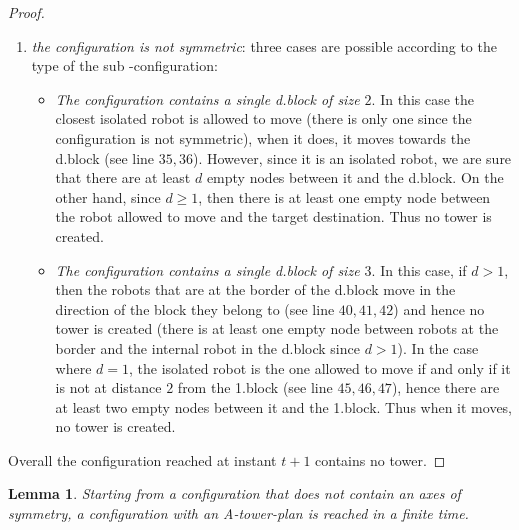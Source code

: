 \documentclass[12pt]{llncs}
\newtheorem{lem}{Lemma}
\begin{document}
\begin{proof}
\begin{enumerate}
\begin{itemize}
\end{itemize}
\item{\textit{the configuration is not symmetric}:} three cases are possible according to the type of the sub -configuration:
\begin{itemize}
\item{\textit{The configuration contains a single d.block of size $2$}}. In this case the closest isolated robot is allowed to move (there is only one since the configuration is not symmetric), when it does, it moves towards the d.block (see line $35,36$). However, since it is an isolated robot, we are sure that there are at least $d$ empty nodes between it and the d.block. On the other hand, since $d\geq 1$, then there is at least one empty node between the robot allowed to move and the target destination. Thus no tower is created.
\item{\textit{The configuration contains a single d.block of size $3$}}. In this case, if $d>1$, then the robots that are at the border of the d.block move in the direction of the block they belong to (see line $40,41,42$) and hence no tower is created (there is at least one empty node between robots at the border and the internal robot in the d.block since $d>1$). In the case where $d=1$, the isolated robot is the one allowed to move if and only if it is not at distance $2$ from the 1.block (see line $45,46,47$), hence there are at least two empty nodes between it and the 1.block. Thus when it moves, no tower is created.  
\end{itemize}
\end{enumerate}

Overall the configuration reached at instant $t+1$ contains no tower.
\end{proof} 

\begin{lem}
\label{lem:nosym}
Starting from a configuration that does not contain an axes of symmetry, a configuration with an A-tower-plan is reached in a finite time. 
\end{lem}
\end{document}
